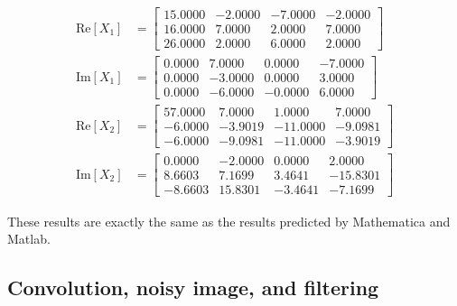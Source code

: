 \documentclass[twocolumn]{myarticle}
\begin{document}
\begin{align}
    \text{Re}[X_1] &= 
    \begin{bmatrix}
         15.0000  &
         -2.0000  &
         -7.0000  &
         -2.0000 
         \\
         16.0000  &
          7.0000  &
          2.0000  &
          7.0000 
         \\
         26.0000  &
          2.0000  &
          6.0000  &
          2.0000 
    \end{bmatrix}
    \\
    \text{Im}[X_1] &= 
    \begin{bmatrix}
          0.0000 &
          7.0000 &
          0.0000 &
         - 7.0000
        \\ 
          0.0000 &
         - 3.0000 &
          0.0000 &
          3.0000
        \\ 
          0.0000 &
         - 6.0000 &
         - 0.0000 &
          6.0000
    \end{bmatrix}
    \\
    \text{Re}[X_2] &=
    \begin{bmatrix}
         57.0000 &
          7.0000 &
          1.0000 &
          7.0000
         \\
         -6.0000 &
         -3.9019 &
        -11.0000 &
         -9.0981
         \\
         -6.0000 &
         -9.0981 &
        -11.0000 &
         -3.9019
    \end{bmatrix}
    \\
    \text{Im}[X_2] &=
    \begin{bmatrix}
          0.0000 &
        -  2.0000 &
          0.0000 &
          2.0000
        \\
          8.6603 &
          7.1699 &
          3.4641 &
        - 15.8301
        \\
        -  8.6603 &
         15.8301 &
        -  3.4641 &
        -  7.1699
    \end{bmatrix}
\end{align}

These results are exactly the same as the results predicted by Mathematica and Matlab.

\subsection{Convolution, noisy image, and filtering}
\label{subsec:convolution_noisy_image_and_filtering}
\end{document}
